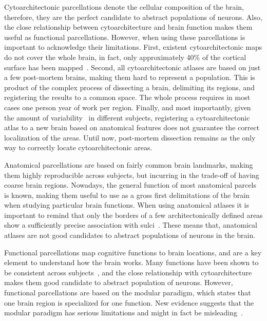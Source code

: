 Cytoarchitectonic parcellations denote the cellular composition of the brain,
therefore, they are the perfect candidate to abstract populations of neurons.
Also, the close relationship between cytoarchitecture and brain function\cite{Amunts2007}
makes them useful as functional parcellations.
However, when using these parcellations is important to acknowledge their limitations.
First, existent cytoarchitectonic maps do not cover the whole brain, in fact, only 
approximately 40\% of the cortical surface has been mapped~\cite{Amunts2007}. Second, all cytoarchitectonic atlases are based on just
a few post-mortem brains, making them hard to represent a population. This is
product of the complex process of dissecting a brain, delimiting its regions,
and registering the results to a common space. The whole process requires in most
cases one person year of work per region. Finally, and most importantly, given the
amount of variability~\cite{Zilles2013} in different subjects, registering a 
cytoarchitectonic atlas to a new brain based on anatomical features does not
guarantee the correct localization of the areas. Until now, post-mortem dissection
remains as the only way to correctly locate cytoarchitectonic areas.

Anatomical parcellations are based on fairly common brain landmarks, making them
highly reproducible across subjects, but incurring in the trade-off of having coarse
brain regions. Nowadays, the general function of most anatomical parcels is
known, making them useful to use as a gross first delimitations of the brain
when studying particular brain functions. When using anatomical atlases it is
important to remind that only the borders of a few architectonically
defined areas show a sufficiently precise association with sulci~\cite{Amunts2007}.
These means that, anatomical atlases are not good candidates to abstract populations
of neurons in the brain.

Functional parcellations map cognitive functions to brain locations, and are
a key element to understand how the brain works. Many functions have been shown
to be consistent across subjects~\cite{Johns, Penfield1954, Yeo2011},
and the close relationship with cytoarchitecture makes them good candidate to
abstract population of neurons. However, functional parcellations are based
on the modular paradigm, which states that one brain region is specialized
for one function. New evidence suggests that the modular paradigm has serious
limitations and might in fact be misleading~\cite{Bressler2010}.

